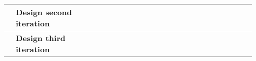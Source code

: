 \begin{table}[ht!]
\begin{tabular}{lp{2.5in}|llllllllllllllllllll|}
    \multicolumn{1}{|l|}{\cellcolor[HTML]{00E2FF}\textbf{}}                & \cellcolor[HTML]{00E2FF}\textbf{Design second iteration}                   & \multicolumn{1}{l|}{}                                   & \multicolumn{1}{l|}{}                                   & \multicolumn{1}{l|}{}                                   & \multicolumn{1}{l|}{}                                   & \multicolumn{1}{l|}{}                                   & \multicolumn{1}{l|}{}                                   & \multicolumn{1}{l|}{}                                   & \multicolumn{1}{l|}{\cellcolor[HTML]{F8A102}}           & \multicolumn{1}{l|}{\cellcolor[HTML]{F8A102}}           & \multicolumn{1}{l|}{\cellcolor[HTML]{F8A102}}            & \multicolumn{1}{l|}{}                                    & \multicolumn{1}{l|}{}                                    & \multicolumn{1}{l|}{}                                    & \multicolumn{1}{l|}{}                                    & \multicolumn{1}{l|}{}                                    & \multicolumn{1}{l|}{}                                    & \multicolumn{1}{l|}{}                                    & \multicolumn{1}{l|}{}                                    & \multicolumn{1}{l|}{}                                    &             \\ \hline
    \multicolumn{1}{|l|}{\cellcolor[HTML]{00E2FF}\textbf{}}                & \cellcolor[HTML]{00E2FF}\textbf{Design third iteration}                    & \multicolumn{1}{l|}{}                                   & \multicolumn{1}{l|}{}                                   & \multicolumn{1}{l|}{}                                   & \multicolumn{1}{l|}{}                                   & \multicolumn{1}{l|}{}                                   & \multicolumn{1}{l|}{}                                   & \multicolumn{1}{l|}{}                                   & \multicolumn{1}{l|}{}                                   & \multicolumn{1}{l|}{}                                   & \multicolumn{1}{l|}{}                                    & \multicolumn{1}{l|}{\cellcolor[HTML]{F8A102}}            & \multicolumn{1}{l|}{\cellcolor[HTML]{F8A102}}            & \multicolumn{1}{l|}{\cellcolor[HTML]{F8A102}}            & \multicolumn{1}{l|}{}                                    & \multicolumn{1}{l|}{}                                    & \multicolumn{1}{l|}{}                                    & \multicolumn{1}{l|}{}                                    & \multicolumn{1}{l|}{}                                    & \multicolumn{1}{l|}{}                                    &             \\ \hline

\end{tabular}
\end{table}
